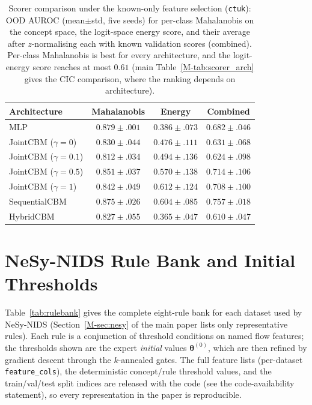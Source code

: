 \documentclass[journal]{IEEEtran}
\begin{document}
\begin{table}[t]
\centering\footnotesize
\caption{Scorer comparison under the known-only feature selection (\texttt{ctuk}): OOD AUROC
(mean${\pm}$std, five seeds) for per-class Mahalanobis on the concept space, the logit-space
energy score, and their average after $z$-normalising each with known validation scores (combined). Per-class Mahalanobis is best for every
architecture, and the logit-energy score reaches at most $0.61$ (main
Table~\ref{M-tab:scorer_arch} gives the CIC comparison, where the ranking depends on architecture).}
\label{tab:kfs_scorer}
\setlength{\tabcolsep}{4pt}
\begin{tabular}{lccc}
\toprule
Architecture & Mahalanobis & Energy & Combined \\
\midrule
MLP                 & $\mathbf{0.879{\pm}.001}$ & $0.386{\pm}.073$ & $0.682{\pm}.046$ \\
JointCBM ($\gamma{=}0$)   & $\mathbf{0.830{\pm}.044}$ & $0.476{\pm}.111$ & $0.631{\pm}.068$ \\
JointCBM ($\gamma{=}0.1$) & $\mathbf{0.812{\pm}.034}$ & $0.494{\pm}.136$ & $0.624{\pm}.098$ \\
JointCBM ($\gamma{=}0.5$) & $\mathbf{0.851{\pm}.037}$ & $0.570{\pm}.138$ & $0.714{\pm}.106$ \\
JointCBM ($\gamma{=}1$)   & $\mathbf{0.842{\pm}.049}$ & $0.612{\pm}.124$ & $0.708{\pm}.100$ \\
SequentialCBM       & $\mathbf{0.875{\pm}.026}$ & $0.604{\pm}.085$ & $0.757{\pm}.018$ \\
HybridCBM           & $\mathbf{0.827{\pm}.055}$ & $0.365{\pm}.047$ & $0.610{\pm}.047$ \\
\bottomrule
\end{tabular}
\end{table}

\section{NeSy-NIDS Rule Bank and Initial Thresholds}
\label{sec:rulebank}

Table~\ref{tab:rulebank} gives the complete eight-rule bank for each dataset used by
NeSy-NIDS (Section~\ref{M-sec:nesy} of the main paper lists only representative rules). Each
rule is a conjunction of threshold conditions on named flow features; the thresholds shown
are the expert \emph{initial} values $\boldsymbol{\theta}^{(0)}$, which are then refined by
gradient descent through the $k$-annealed gates. The full feature
lists (per-dataset \texttt{feature\_cols}), the deterministic concept/rule threshold
values, and the train/val/test split indices are released with the code (see the
code-availability statement), so every representation in the paper is reproducible.
\end{document}
